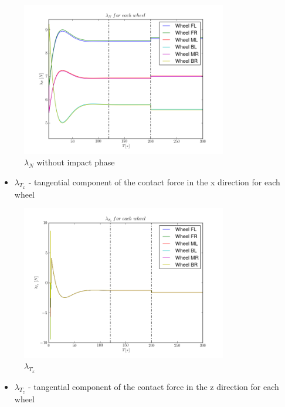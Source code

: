 \begin{figure}[H]
  \centering
    \includegraphics[width=0.8\textwidth]{lambdaN5zoom}
  \caption{$\lambda_N$ without impact phase}
\end{figure}

\begin{itemize}
  \item $\lambda_{T_x}$ - tangential component of the contact force in the x direction for each wheel
\end{itemize}

\begin{figure}[H]
  \centering
    \includegraphics[width=0.8\textwidth]{lambdaTx5}
  \caption{$\lambda_{T_x}$}
\end{figure}

\begin{itemize}
  \item $\lambda_{T_z}$ - tangential component of the contact force in the z direction for each wheel
\end{itemize}

